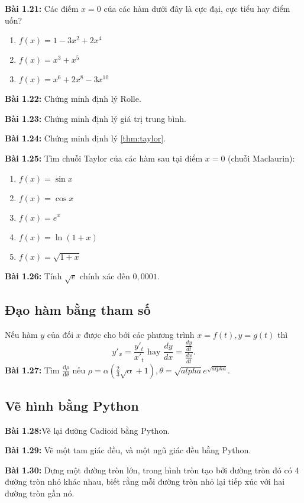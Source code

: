 \textbf{Bài 1.21:} Các điếm \(x=0\) của các hàm dưới đây là cực đại, cực tiểu hay điểm uốn?
\begin{enumerate}[label=(\alph*)]
    \item \(f(x)=1-3x^2+2x^4\)
    \item \(f(x)=x^3+x^5\)
    \item \(f(x)=x^6+2x^8-3x^{10}\)
\end{enumerate}
\vspace{5pt}

\textbf{Bài 1.22:} Chứng minh định lý Rolle.
\vspace{5pt}

\textbf{Bài 1.23:} Chứng minh định lý giá trị trung bình.
\vspace{5pt}

\textbf{Bài 1.24:} Chứng minh định lý \ref{thm:taylor}.

\textbf{Bài 1.25:} Tìm chuỗi Taylor của các hàm sau tại điểm \(x=0\) (chuỗi Maclaurin):
\begin{enumerate}[label=(\alph*)]
    \item \(f(x)=\sin x\)
    \item \(f(x)=\cos x\)
    \item \(f(x)=e^x\)
    \item \(f(x)=\ln(1+x)\)
    \item \(f(x)=\sqrt{1+x}\)
\end{enumerate}
\vspace{5pt}

\textbf{Bài 1.26:} Tính \(\sqrt{e}\) chính xác đến \(0,0001\). 
\vspace{5pt}

\subsection*{Đạo hàm bằng tham số}
Nếu hàm \(y\) của đối \(x\) được cho bởi các phương trình \(x=f(t), y=g(t)\) thì
\[y'_x =\frac{y'_t}{x'_t} \text{ hay } \frac{dy}{dx}=\frac{\frac{dy}{dt}}{\frac{dx}{dt}}.\] 
\textbf{Bài 1.27:} Tìm \(\frac{\text{d}\rho}{\text{d}\theta}\) nếu \(\rho=\alpha\left(\frac{2}{3}\sqrt{\alpha}+1\right), \theta = \sqrt{alpha}e^{\sqrt{alpha}}.\)

\subsection*{Vẽ hình bằng Python}
\textbf{Bài 1.28:}Vẽ lại đường Cadioid  bằng Python.
\vspace{5pt}

\textbf{Bài 1.29:} Vẽ một tam giác đều, và một ngũ giác đều bằng Python.
\vspace{5pt}

\textbf{Bài 1.30:} Dựng một đường tròn lớn, trong hình tròn tạo bởi đường tròn đó có 4 đường tròn nhỏ khác nhau, biết rằng mỗi đường tròn nhỏ lại tiếp xúc với hai đường tròn gần nó.
\vspace{5pt}



